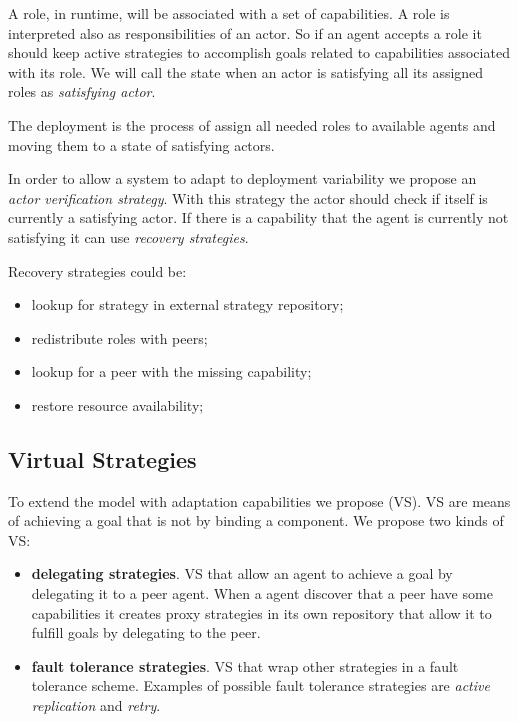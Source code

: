 A role, in runtime, will be associated with a set of capabilities. A role is interpreted also as responsibilities of an actor. So if an agent accepts a role it should keep active strategies to accomplish goals related to capabilities associated with its role.
We will call the state when an actor is satisfying all its assigned roles as \textit{satisfying actor}.

The deployment is the process of assign all needed roles to available agents and moving them to a state of satisfying actors.

In order to allow a system to adapt to deployment variability we propose an \textit{actor verification strategy}. With this strategy the actor should check if itself is currently a satisfying actor. If there is a capability that the agent is currently not satisfying it can use \textit{recovery strategies}.

Recovery strategies could be:
\begin{itemize}
  \item lookup for strategy in external strategy repository;
  \item redistribute roles with peers;
  \item lookup for a peer with the missing capability;
  \item restore resource availability;
\end{itemize}

\subsection{Virtual Strategies}

To extend the model with adaptation capabilities we propose  (VS). VS are means of achieving a goal that is not by binding a component. We propose two kinds of VS:

\begin{itemize}
  \item \textbf{delegating strategies}. VS that allow an agent to achieve a goal by delegating it to a peer agent. When a agent discover that a peer have some capabilities it creates proxy strategies in its own repository that allow it to fulfill goals by delegating to the peer.
  \item \textbf{fault tolerance strategies}. VS that wrap other strategies in a fault tolerance scheme. Examples of possible fault tolerance strategies are \textit{active replication} and \textit{retry}.
\end{itemize}

